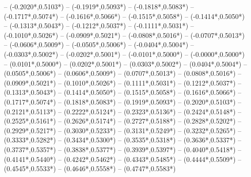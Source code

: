 {	-- ({-0.2020*\dx},{0.5103*\dy})
	-- ({-0.1919*\dx},{0.5093*\dy})
	-- ({-0.1818*\dx},{0.5083*\dy})
	-- ({-0.1717*\dx},{0.5074*\dy})
	-- ({-0.1616*\dx},{0.5066*\dy})
	-- ({-0.1515*\dx},{0.5058*\dy})
	-- ({-0.1414*\dx},{0.5050*\dy})
	-- ({-0.1313*\dx},{0.5043*\dy})
	-- ({-0.1212*\dx},{0.5037*\dy})
	-- ({-0.1111*\dx},{0.5031*\dy})
	-- ({-0.1010*\dx},{0.5026*\dy})
	-- ({-0.0909*\dx},{0.5021*\dy})
	-- ({-0.0808*\dx},{0.5016*\dy})
	-- ({-0.0707*\dx},{0.5013*\dy})
	-- ({-0.0606*\dx},{0.5009*\dy})
	-- ({-0.0505*\dx},{0.5006*\dy})
	-- ({-0.0404*\dx},{0.5004*\dy})
	-- ({-0.0303*\dx},{0.5002*\dy})
	-- ({-0.0202*\dx},{0.5001*\dy})
	-- ({-0.0101*\dx},{0.5000*\dy})
	-- ({-0.0000*\dx},{0.5000*\dy})
	-- ({0.0101*\dx},{0.5000*\dy}) %
	-- ({0.0202*\dx},{0.5001*\dy}) %
	-- ({0.0303*\dx},{0.5002*\dy}) %
	-- ({0.0404*\dx},{0.5004*\dy}) %
	-- ({0.0505*\dx},{0.5006*\dy}) %
	-- ({0.0606*\dx},{0.5009*\dy}) %
	-- ({0.0707*\dx},{0.5013*\dy}) %
	-- ({0.0808*\dx},{0.5016*\dy}) %
	-- ({0.0909*\dx},{0.5021*\dy}) %
	-- ({0.1010*\dx},{0.5026*\dy}) %
	-- ({0.1111*\dx},{0.5031*\dy}) %
	-- ({0.1212*\dx},{0.5037*\dy}) %
	-- ({0.1313*\dx},{0.5043*\dy}) %
	-- ({0.1414*\dx},{0.5050*\dy}) %
	-- ({0.1515*\dx},{0.5058*\dy}) %
	-- ({0.1616*\dx},{0.5066*\dy}) %
	-- ({0.1717*\dx},{0.5074*\dy}) %
	-- ({0.1818*\dx},{0.5083*\dy}) %
	-- ({0.1919*\dx},{0.5093*\dy}) %
	-- ({0.2020*\dx},{0.5103*\dy}) %
	-- ({0.2121*\dx},{0.5113*\dy}) %
	-- ({0.2222*\dx},{0.5124*\dy}) %
	-- ({0.2323*\dx},{0.5136*\dy}) %
	-- ({0.2424*\dx},{0.5148*\dy}) %
	-- ({0.2525*\dx},{0.5161*\dy}) %
	-- ({0.2626*\dx},{0.5174*\dy}) %
	-- ({0.2727*\dx},{0.5188*\dy}) %
	-- ({0.2828*\dx},{0.5202*\dy}) %
	-- ({0.2929*\dx},{0.5217*\dy}) %
	-- ({0.3030*\dx},{0.5233*\dy}) %
	-- ({0.3131*\dx},{0.5249*\dy}) %
	-- ({0.3232*\dx},{0.5265*\dy}) %
	-- ({0.3333*\dx},{0.5282*\dy}) %
	-- ({0.3434*\dx},{0.5300*\dy}) %
	-- ({0.3535*\dx},{0.5318*\dy}) %
	-- ({0.3636*\dx},{0.5337*\dy}) %
	-- ({0.3737*\dx},{0.5357*\dy}) %
	-- ({0.3838*\dx},{0.5377*\dy}) %
	-- ({0.3939*\dx},{0.5397*\dy}) %
	-- ({0.4040*\dx},{0.5418*\dy}) %
	-- ({0.4141*\dx},{0.5440*\dy}) %
	-- ({0.4242*\dx},{0.5462*\dy}) %
	-- ({0.4343*\dx},{0.5485*\dy}) %
	-- ({0.4444*\dx},{0.5509*\dy}) %
	-- ({0.4545*\dx},{0.5533*\dy}) %
	-- ({0.4646*\dx},{0.5558*\dy}) %
	-- ({0.4747*\dx},{0.5583*\dy}) %
}

